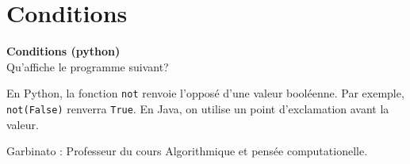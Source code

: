 \newpage

\section{Conditions}

\begin{Exercice}[5 minutes] \textbf{Conditions (python)}\\
    Qu'affiche le programme suivant? \\
    
    

     \begin{conseil}
         En Python, la fonction \lstinline{not} renvoie l'opposé d'une valeur booléenne. Par exemple, \lstinline{not(False)} renverra \lstinline{True}. En Java, on utilise un point d'exclamation avant la valeur.
     \end{conseil}
     \begin{solution}
        Garbinato : Professeur du cours Algorithmique et pensée computationelle.
     \end{solution}   
 \end{Exercice}

